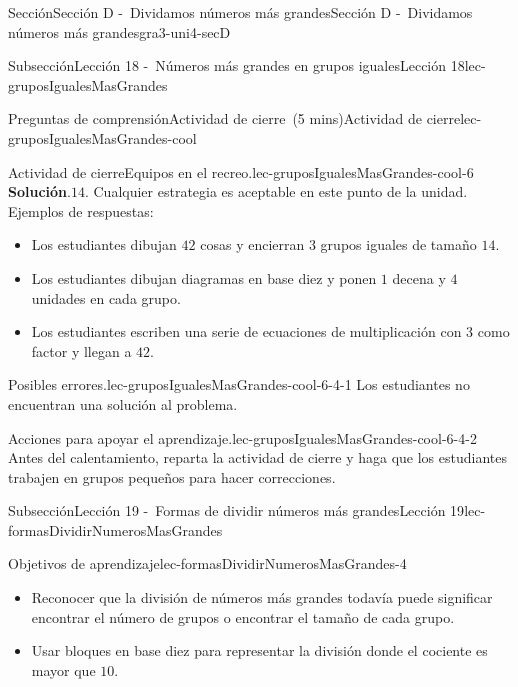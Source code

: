 \documentclass[oneside,10pt,]{article}
\newcommand{\blocktitlefont}{\relax}
\begin{document}
\begin{sectionptx}{Sección}{Sección D -~Dividamos números más grandes}{}{Sección D -~Dividamos números más grandes}{}{}{gra3-uni4-secD}
\begin{subsectionptx}{Subsección}{Lección 18 -~Números más grandes en grupos iguales}{}{Lección 18}{}{}{lec-gruposIgualesMasGrandes}
\begin{reading-questions-subsubsection}{Preguntas de comprensión}{Actividad de cierre~(5 mins)}{}{Actividad de cierre}{}{}{lec-gruposIgualesMasGrandes-cool}
\begin{project}{Actividad de cierre}{Equipos en el recreo.}{lec-gruposIgualesMasGrandes-cool-6}
\noindent\textbf{\blocktitlefont Solución}.\hypertarget{lec-gruposIgualesMasGrandes-cool-6-3}{}\quad{}\(14\). Cualquier estrategia es aceptable en este punto de la unidad. Ejemplos de respuestas:%
%
\begin{itemize}[label=\textbullet]
\item{}Los estudiantes dibujan \(42\) cosas y encierran \(3\) grupos iguales de tamaño \(14\).%
\item{}Los estudiantes dibujan diagramas en base diez y ponen \(1\) decena y \(4\) unidades en cada grupo.%
\item{}Los estudiantes escriben una serie de ecuaciones de multiplicación con \(3\) como factor y llegan a \(42\).%
\end{itemize}
\end{project}%
\par
\begin{paragraphs}{Posibles errores.}{lec-gruposIgualesMasGrandes-cool-6-4-1}%
Los estudiantes no encuentran una solución al problema.%
\end{paragraphs}%
\begin{paragraphs}{Acciones para apoyar el aprendizaje.}{lec-gruposIgualesMasGrandes-cool-6-4-2}%
Antes del calentamiento, reparta la actividad de cierre y haga que los estudiantes trabajen en grupos pequeños para hacer correcciones.%
\end{paragraphs}%
\end{reading-questions-subsubsection}
\end{subsectionptx}
%
%
\typeout{************************************************}
\typeout{************************************************}
%
\begin{subsectionptx}{Subsección}{Lección 19 -~Formas de dividir números más grandes}{}{Lección 19}{}{}{lec-formasDividirNumerosMasGrandes}
\begin{objectives}{Objetivos de aprendizaje}{lec-formasDividirNumerosMasGrandes-4}
%
\begin{itemize}[label=\textbullet]
\item{}Reconocer que la división de números más grandes todavía puede significar encontrar el número de grupos o encontrar el tamaño de cada grupo.%
\item{}Usar bloques en base diez para representar la división donde el cociente es mayor que \(10\).%
\end{itemize}
\end{objectives}
\begin{introduction}{}%

\end{introduction}
\end{subsectionptx}
\end{sectionptx}
\end{document}
